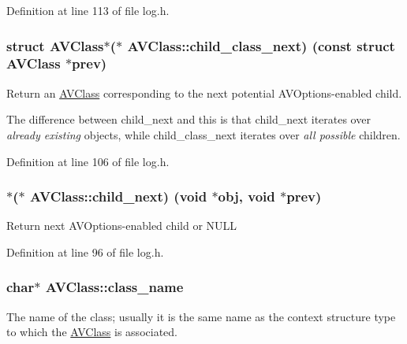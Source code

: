Definition at line 113 of file log.\+h.

\subsubsection[{\texorpdfstring{child\+\_\+class\+\_\+next}{child_class_next}}]{ struct {\bf A\+V\+Class}$\ast$($\ast$ A\+V\+Class\+::child\+\_\+class\+\_\+next) ({\bf const} struct {\bf A\+V\+Class} $\ast$prev)}\hypertarget{struct_a_v_class_af1446f94b0cfc1de453319e972eed61d}{}\label{struct_a_v_class_af1446f94b0cfc1de453319e972eed61d}
Return an \hyperlink{struct_a_v_class}{A\+V\+Class} corresponding to the next potential A\+V\+Options-\/enabled child.

The difference between child\+\_\+next and this is that child\+\_\+next iterates over {\itshape already existing} objects, while child\+\_\+class\+\_\+next iterates over {\itshape all possible} children. 

Definition at line 106 of file log.\+h.

\subsubsection[{\texorpdfstring{child\+\_\+next}{child_next}}]{$\ast$($\ast$ A\+V\+Class\+::child\+\_\+next) ({\bf void} $\ast$obj, {\bf void} $\ast$prev)}\hypertarget{struct_a_v_class_a1e996ee57c93f5513281c04f68440cff}{}\label{struct_a_v_class_a1e996ee57c93f5513281c04f68440cff}
Return next A\+V\+Options-\/enabled child or N\+U\+LL 

Definition at line 96 of file log.\+h.

\subsubsection[{\texorpdfstring{class\+\_\+name}{class_name}}]{ char$\ast$ A\+V\+Class\+::class\+\_\+name}\hypertarget{struct_a_v_class_aa8883e113a3f2965abd008f7667db7eb}{}\label{struct_a_v_class_aa8883e113a3f2965abd008f7667db7eb}
The name of the class; usually it is the same name as the context structure type to which the \hyperlink{struct_a_v_class}{A\+V\+Class} is associated. 

